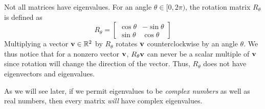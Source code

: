 \documentclass[colorful]{notes}
\begin{document}
    \begin{example}
        Not all matrices have eigenvalues. For an angle $\theta \in [0, 2\pi)$, the rotation matrix $R_\theta$ is defined as 
        \begin{equation*}
            R_\theta = \begin{bmatrix}
                \cos \theta & -\sin \theta \\ \sin \theta & \cos \theta
            \end{bmatrix}
        \end{equation*}
        Multiplying a vector $\mathbf{v} \in \mathbb{R}^2$ by $R_\theta$ rotates $\mathbf{v}$ counterclockwise by an angle $\theta$. We thus notice that for a nonzero vector $\mathbf{v}$, $R_\theta \mathbf{v}$ can never be a scalar multiple of $\mathbf{v}$ since rotation will change the direction of the vector. Thus, $R_\theta$ does not have eigenvectors and eigenvalues. 

        As we will see later, if we permit eigenvalues to be \emph{complex numbers} as well as real numbers, then every matrix \emph{will} have complex eigenvalues.
    \end{example}
\end{document}

